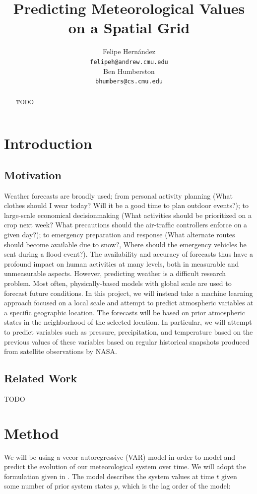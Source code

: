 \documentclass{article} %
\title{Predicting Meteorological Values on a Spatial Grid}
\author{
Felipe Hern\'{a}ndez \\
\texttt{felipeh@andrew.cmu.edu} \\
\And
Ben Humberston\\
\texttt{bhumbers@cs.cmu.edu} \\
}
\begin{document}
\maketitle

\begin{abstract}
TODO
\end{abstract}

\section{Introduction}
\label{sec:intro}

\subsection{Motivation}
\label{sec:motivation}
Weather forecasts are broadly used; from personal activity planning (What clothes should I wear 
today? Will it be a good time to plan outdoor events?); to large-scale economical decisionmaking (What activities should be prioritized on a crop next week? What precautions should the 
air-traffic controllers enforce on a given day?); to emergency preparation and response (What 
alternate routes should become available due to snow?, Where should the emergency vehicles 
be sent during a flood event?). The availability and accuracy of forecasts thus have a profound 
impact on human activities at many levels, both in measurable and unmeasurable aspects.
However, predicting weather is a difficult research problem. Most often, physically-based 
models with global scale are used to forecast future conditions. In this project, we will instead 
take a machine learning approach focused on a local scale and attempt to predict atmospheric 
variables at a specific geographic location. The forecasts will be based on prior atmospheric 
states in the neighborhood of the selected location. In particular, we will attempt to predict 
variables such as pressure, precipitation, and temperature based on the previous values of 
these variables based on regular historical snapshots produced from satellite observations by 
NASA.

\subsection{Related Work}\label{sec:related_work}
TODO

\section{Method}
\label{sec:method}
We will be using a vecor autoregressive (VAR) model in order to model and predict the evolution of our meteorological system over time.  We will adopt the formulation given in \cite{SpluTimeSeries2006}.  The model describes the system values at time $t$ given some number of prior system states $p$, which is the lag order of the model:
\end{document}
